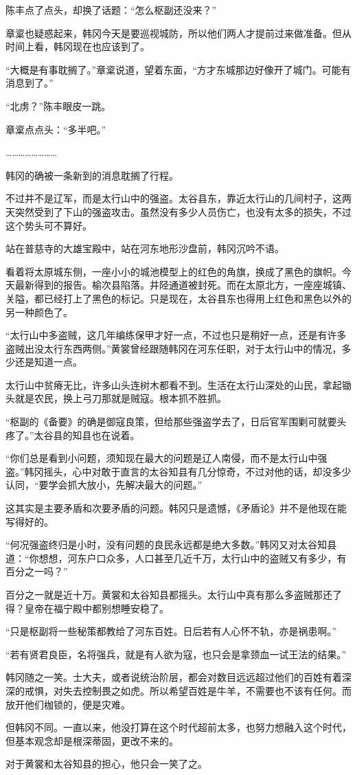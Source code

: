 陈丰点了点头，却换了话题：“怎么枢副还没来？”

章楶也疑惑起来，韩冈今天是要巡视城防，所以他们两人才提前过来做准备。但从时间上看，韩冈现在也应该到了。

“大概是有事耽搁了。”章楶说道，望着东面，“方才东城那边好像开了城门。可能有消息到了。”

“北虏？”陈丰眼皮一跳。

章楶点点头：“多半吧。”

……………………

韩冈的确被一条新到的消息耽搁了行程。

不过并不是辽军，而是太行山中的强盗。太谷县东，靠近太行山的几间村子，这两天突然受到了下山的强盗攻击。虽然没有多少人员伤亡，也没有太多的损失，不过这个势头可不算好。

站在普慈寺的大雄宝殿中，站在河东地形沙盘前，韩冈沉吟不语。

看着将太原城东侧，一座小小的城池模型上的红色的角旗，换成了黑色的旗帜。今天最新得到的报告。榆次县陷落。井陉通道被封死。而在太原北方，一座座城镇、关隘，都已经打上了黑色的标记。只是现在，太谷县东也得用上红色和黑色以外的另一种颜色了。

“太行山中多盗贼，这几年编练保甲才好一点，不过也只是稍好一点，还是有许多盗贼出没太行东西两侧。”黄裳曾经跟随韩冈在河东任职，对于太行山中的情况，多少还是知道一点。

太行山中贫瘠无比，许多山头连树木都看不到。生活在太行山深处的山民，拿起锄头就是农民，换上弓刀那就是贼寇。根本抓不胜抓。

“枢副的《备要》的确是御寇良策，但给那些强盗学去了，日后官军围剿可就要头疼了。”太谷县的知县也在说着。

“你们总是看到小问题，须知现在最大的问题是辽人南侵，而不是太行山中强盗。”韩冈摇头，心中对敢于直言的太谷知县有几分惊奇，不过对他的话，却没多少认同，“要学会抓大放小，先解决最大的问题。”

这其实是主要矛盾和次要矛盾的问题。韩冈只是遗憾，《矛盾论》并不是他现在能写得好的。

“何况强盗终归是小时，没有问题的良民永远都是绝大多数。”韩冈又对太谷知县道：“你想想，河东户口众多，人口甚至几近千万，太行山中的盗贼又有多少，有百分之一吗？”

百分之一就是近十万。黄裳和太谷知县都摇头。太行山中真有那么多盗贼那还了得？皇帝在福宁殿中都别想睡安稳了。

“只是枢副将一些秘策都教给了河东百姓。日后若有人心怀不轨，亦是祸患啊。”

“若有贤君良臣，名将强兵，就是有人欲为寇，也只会是拿颈血一试王法的结果。”

韩冈随之一笑。士大夫，或者说统治阶层，都会对数目远远超过他们的百姓有着深深的戒惧，对失去控制畏之如虎。所以希望百姓是牛羊，不需要也不该有任何。而放开他们枷锁的，便是灾难。

但韩冈不同。一直以来，他没打算在这个时代超前太多，也努力想融入这个时代，但基本观念却是根深蒂固，更改不来的。

对于黄裳和太谷知县的担心，他只会一笑了之。
